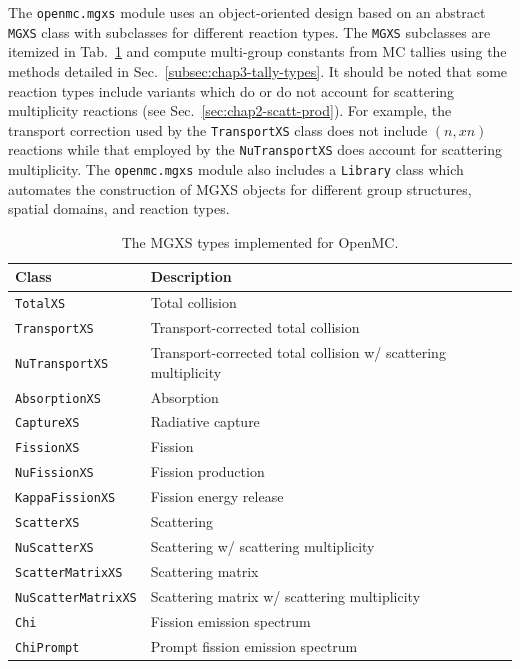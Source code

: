 The \texttt{openmc.mgxs} module uses an object-oriented design based on an abstract \texttt{MGXS} class with subclasses for different reaction types. The \texttt{MGXS} subclasses are itemized in Tab.~\ref{table:chap4-mgxs-types} and compute multi-group constants from \ac{MC} tallies using the methods detailed in Sec.~\ref{subsec:chap3-tally-types}. It should be noted that some reaction types include variants which do or do not account for scattering multiplicity reactions (see Sec.~\ref{sec:chap2-scatt-prod}). For example, the transport correction used by the \texttt{TransportXS} class does not include $(n,xn)$ reactions while that employed by the \texttt{NuTransportXS} does account for scattering multiplicity. The \texttt{openmc.mgxs} module also includes a \texttt{Library} class which automates the construction of \ac{MGXS} objects for different group structures, spatial domains, and reaction types.

\begin{table}[h!]
  \centering
  \caption[The MGXS types implemented for OpenMC]{The \ac{MGXS} types implemented for OpenMC.}
  \small
  \label{table:chap4-mgxs-types} 
  \vspace{6pt}
  \begin{tabular}{l p{10cm}}
  \toprule
  \rowcolor{lightgray}
  {\bf Class} &
  {\bf Description} \\
  \midrule
  \texttt{TotalXS} & Total collision \\
  \texttt{TransportXS} & Transport-corrected total collision \\
  \texttt{NuTransportXS} & Transport-corrected total collision w/ scattering multiplicity \\
  \texttt{AbsorptionXS} & Absorption \\
  \texttt{CaptureXS} & Radiative capture \\
  \texttt{FissionXS} & Fission \\
  \texttt{NuFissionXS} & Fission production \\
  \texttt{KappaFissionXS} & Fission energy release \\
  \texttt{ScatterXS} & Scattering \\
  \texttt{NuScatterXS} & Scattering w/ scattering multiplicity \\
  \texttt{ScatterMatrixXS} & Scattering matrix \\
  \texttt{NuScatterMatrixXS} & Scattering matrix w/ scattering multiplicity \\
  \texttt{Chi} & Fission emission spectrum \\
  \texttt{ChiPrompt} & Prompt fission emission spectrum \\
  \bottomrule
\end{tabular}
\end{table}

